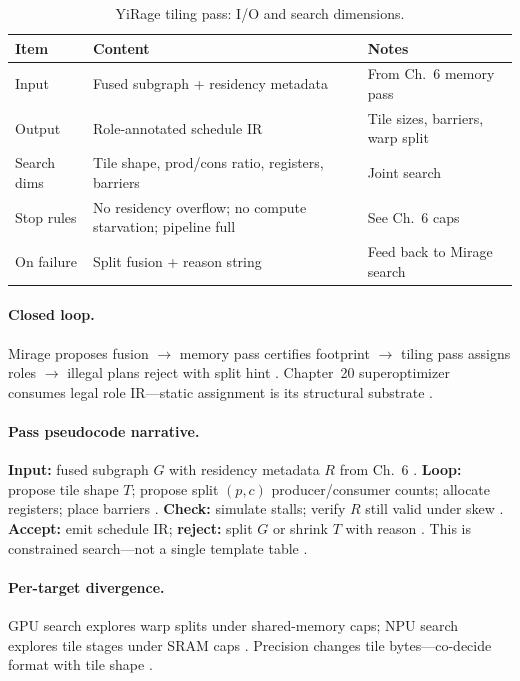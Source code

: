 \begin{table}[t]
\centering
\small
\caption{YiRage tiling pass: I/O and search dimensions.}
\label{tab:ch07_tiling_pass_io}
\begin{tabular}{@{}p{2.4cm}p{4.8cm}p{3.8cm}@{}}
\toprule
\textbf{Item} & \textbf{Content} & \textbf{Notes} \\
\midrule
Input & Fused subgraph + residency metadata & From Ch.~6 memory pass \\
Output & Role-annotated schedule IR & Tile sizes, barriers, warp split \\
Search dims & Tile shape, prod/cons ratio, registers, barriers & Joint search \\
Stop rules & No residency overflow; no compute starvation; pipeline full & See Ch.~6 caps \\
On failure & Split fusion + reason string & Feed back to Mirage search \\
\bottomrule
\end{tabular}
\end{table}

\paragraph{Closed loop.}
Mirage proposes fusion $\rightarrow$ memory pass certifies footprint $\rightarrow$ tiling pass assigns roles $\rightarrow$ illegal plans reject with split hint \citep{wu2024mirage,yirage2026,mpk2025}.
Chapter~20 superoptimizer consumes legal role IR---static assignment is its structural substrate \citep{mpk2025,chen2020compilerbasedhardw}.

\paragraph{Pass pseudocode narrative.}
\textbf{Input:} fused subgraph $G$ with residency metadata $R$ from Ch.~6 \citep{yirage2026,chen2020compilerbasedhardw}.
\textbf{Loop:} propose tile shape $T$; propose split $(p,c)$ producer/consumer counts; allocate registers; place barriers \citep{shah2024flashattention3,wu2024mirage}.
\textbf{Check:} simulate stalls; verify $R$ still valid under skew \citep{memoryfloor2026,dao2022flashattention}.
\textbf{Accept:} emit schedule IR; \textbf{reject:} split $G$ or shrink $T$ with reason \citep{yirage2026,patel2025llminference,mpk2025}.
This is constrained search---not a single template table \citep{wu2024mirage,chen2020compilerbasedhardw}.

\paragraph{Per-target divergence.}
GPU search explores warp splits under shared-memory caps; NPU search explores tile stages under SRAM caps \citep{amd2024aie,nvidia2022hopper,yirage2026}.
Precision changes tile bytes---co-decide format with tile shape \citep{shah2024flashattention3,dlbook,memoryfloor2026}.

